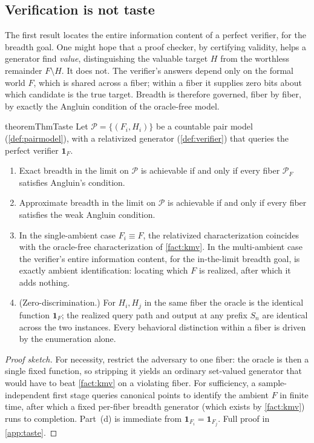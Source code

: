 \documentclass[11pt]{article}
\numberwithin{equation}{section}
\newcommand{\mc}[1]{\mathcal{#1}}
\newcommand{\Amb}{F}
\newcommand{\Val}{H}
\newcommand{\Pairs}{\mc{P}}
\newcommand{\Seen}{S}
\newcommand{\fiber}[1]{\Pairs_{#1}}
\theoremstyle{plain}
\theoremstyle{definition}
\theoremstyle{remark}
\begin{document}
\subsection{Verification is not taste}
\label{sec:res-taste}

The first result locates the entire information content of a perfect verifier, for the breadth
goal. One might hope that a proof checker, by certifying validity, helps a generator find
\emph{value}, distinguishing the valuable target $\Val$ from the worthless remainder $\Amb
\setminus \Val$. It does not. The verifier's answers depend only on the formal world $\Amb$,
which is shared across a fiber; within a fiber it supplies zero bits about which candidate is
the true target. Breadth is therefore governed, fiber by fiber, by exactly the Angluin
condition of the oracle-free model.

\begin{restatable}{theorem}{ThmTaste}\label{thm:taste}
Let $\Pairs = \{(\Amb_i, \Val_i)\}$ be a countable pair model (\cref{def:pairmodel}), with a
relativized generator (\cref{def:verifier}) that queries the perfect verifier $\mathbf
1_{\Amb}$.
\begin{enumerate}[label=\textup{(\alph*)}]
  \item Exact breadth in the limit on $\Pairs$ is achievable if and only if every fiber
    $\fiber{\Amb}$ satisfies Angluin's condition.
  \item Approximate breadth in the limit on $\Pairs$ is achievable if and only if every fiber
    satisfies the weak Angluin condition.
  \item In the single-ambient case $\Amb_i \equiv \Amb$, the relativized characterization
    coincides with the oracle-free characterization of \cref{fact:kmv}. In the multi-ambient
    case the verifier's entire information content, for the in-the-limit breadth goal, is
    exactly ambient identification: locating which $\Amb$ is realized, after which it adds
    nothing.
  \item \textup{(Zero-discrimination.)} For $\Val_i, \Val_j$ in the same fiber the oracle is
    the identical function $\mathbf 1_{\Amb}$; the realized query path and output at any
    prefix $\Seen_n$ are identical across the two instances. Every behavioral distinction
    within a fiber is driven by the enumeration alone.
\end{enumerate}
\end{restatable}

\begin{proof}[Proof sketch]
For necessity, restrict the adversary to one fiber: the oracle is then a single fixed
function, so stripping it yields an ordinary set-valued generator that would have to beat
\cref{fact:kmv} on a violating fiber. For sufficiency, a sample-independent first stage
queries canonical points to identify the ambient $\Amb$ in finite time, after which a fixed
per-fiber breadth generator (which exists by \cref{fact:kmv}) runs to completion. Part~(d) is
immediate from $\mathbf 1_{\Amb_i} = \mathbf 1_{\Amb_j}$. Full proof in \cref{app:taste}.
\end{proof}
\end{document}
